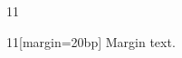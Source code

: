 \documentclass[paper=A4]{ropas-poster}
\begin{document}
\begin{postergrid}{1}{1}
\begin{posterblock}{1}{1}[margin=20bp]
Margin text.
\end{posterblock}
\end{postergrid}
\end{document}
